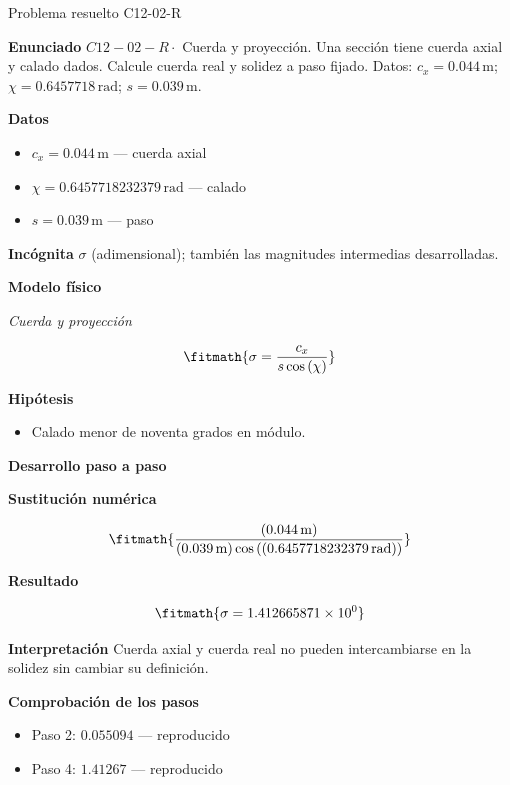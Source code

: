 \documentclass[10pt,openany]{book}
\begin{document}
\begin{studiumworked}{Problema resuelto C12-02-R}


\noindent\textbf{Enunciado}
\(C12-02-R \cdot\) Cuerda y proyección. Una sección tiene cuerda axial y calado dados. Calcule cuerda real y solidez a paso fijado. Datos: \(c_x=0.044\, \mathrm{m}\); \(\chi=0.6457718\, \mathrm{rad}\); \(s=0.039\, \mathrm{m}\).

\noindent\textbf{Datos}
\begin{itemize}
\item $c_x = 0.044\,\mathrm{m}$ — cuerda axial
\item $\chi = 0.6457718232379\,\mathrm{rad}$ — calado
\item $s = 0.039\,\mathrm{m}$ — paso
\end{itemize}

\noindent\textbf{Incógnita}
$\sigma$ (adimensional); también las magnitudes intermedias desarrolladas.

\noindent\textbf{Modelo físico}

\noindent\textit{Cuerda y proyección}

\[
\fitmath{\sigma=\frac{c_x}{s \cos{\left(\chi \right)}}}
\]

\noindent\textbf{Hipótesis}
\begin{itemize}
\item Calado menor de noventa grados en módulo.
\end{itemize}

\noindent\textbf{Desarrollo paso a paso}



\noindent\textbf{Sustitución numérica}

\[
\fitmath{\frac{\left(0.044\,\mathrm{m}\right)}{\left(0.039\,\mathrm{m}\right) \cos{\left(\left(0.6457718232379\,\mathrm{rad}\right) \right)}}}
\]

\noindent\textbf{Resultado}

\[
\fitmath{\sigma=1.412665871\times10^{0}}
\]

\noindent\textbf{Interpretación}
Cuerda axial y cuerda real no pueden intercambiarse en la solidez sin cambiar su definición.

\noindent\textbf{Comprobación de los pasos}
\begin{itemize}
\item Paso 2: $0.055094$ — reproducido
\item Paso 4: $1.41267$ — reproducido
\end{itemize}


\end{studiumworked}
\end{document}
